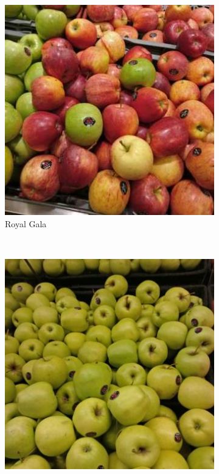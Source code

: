 

\begin{figure}[t] 
	\centering
	\begin{minipage}[b]{0.47\textwidth}
		\centering
		\captionsetup{font=scriptsize}
		\begin{subfigure}[t]{0.32\textwidth}
			\centering
			\includegraphics[width=\textwidth]{PaperA/dataset-figure/Royal-Gala-Apple_84_crop.jpg}
			\caption{Royal Gala}
			\label{subfig:real-image-a}
		\end{subfigure}~
		\begin{subfigure}[t]{0.32\textwidth}
			\centering
			\includegraphics[width=\textwidth]{PaperA/dataset-figure/Golden-Delicious-Apple_7.jpg}

\end{subfigure}
\end{minipage}
\end{figure}

